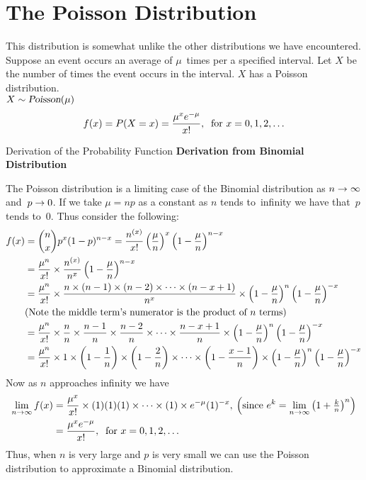 \section{The Poisson Distribution}
This distribution is somewhat unlike the other distributions we have encountered. Suppose an event occurs an average of $\mu$~times per a specified interval. Let $X$ be the number of times the event occurs in the interval. $X$ has a Poisson distribution. \\
$X \sim \operatorname{\textsl{Poisson}}(\mu)$
\[
    f(x) = P(X = x) = \frac{\mu^x e^{-\mu}}{x!},\:\text{ for } x = 0,1,2,\ldots
\]
\begin{theory}{Derivation of the Probability Function}
\textbf{Derivation from Binomial Distribution}\par
The Poisson distribution is a limiting case of the Binomial distribution as $n \rightarrow \infty$ and~$p \rightarrow 0$. If we take $\mu = np$ as a constant as $n$ tends to~infinity we have that~$p$ tends to~0. Thus consider the following:
\begin{align*}
    f(x) &= \binom{n}{x} p^x (1-p)^{n-x} 
          = \frac{n^{(x)}}{x!} \left(\frac{\mu}{n}\right)^x \left(1-\frac{\mu}{n}\right)^{n-x} \\
         &= \frac{\mu^n}{x!} \times \frac{n^{(x)}}{n^x} \left(1-\frac{\mu}{n}\right)^{n-x} \\
         &= \frac{\mu^n}{x!} \times \frac{n \times (n-1) \times (n-2) \times \cdots \times (n-x+1)}{n^x} \times \left(1-\frac{\mu}{n}\right)^{n}\left(1-\frac{\mu}{n}\right)^{-x} \\
         &\text{(Note the middle term's numerator is the product of $n$ terms)} \\
         &= \frac{\mu^n}{x!} \times \frac{n}{n} \times \frac{n-1}{n} \times \frac{n-2}{n} \times \cdots \times \frac{n-x+1}{n} \times \left(1-\frac{\mu}{n}\right)^{n}\left(1-\frac{\mu}{n}\right)^{-x} \\
         &= \frac{\mu^n}{x!} \times 1 \times \left(1-\frac{1}{n}\right) \times \left(1-\frac{2}{n}\right) \times \cdots \times \left(1-\frac{x-1}{n}\right) \times \left(1-\frac{\mu}{n}\right)^{n}\left(1-\frac{\mu}{n}\right)^{-x} \\
\end{align*}
Now as $n$ approaches infinity we have
\begin{align*}
    \lim_{n \rightarrow \infty} f(x) 
    &= \frac{\mu^x}{x!}\times (1)(1)(1)\times\cdots\times(1) \times e^{-\mu} (1)^{-x}
    ,\:\left(\text{since } e^k = \lim_{n \rightarrow \infty}\left(1 + \textstyle\frac{k}{n}\right)^n\right) \\
    &= \frac{\mu^x e^{-\mu}}{x!},\:\text{ for } x = 0,1,2,\ldots
\end{align*}
Thus, when $n$ is very large and $p$ is very small we can use the Poisson distribution to approximate a Binomial distribution.
\end{theory}